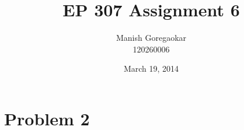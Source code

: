 \documentclass[12pt]{article}
\title{EP 307 Assignment 6}
\author{Manish Goregaokar\\120260006}
\date{March 19, 2014}
\begin{document}
\maketitle
\section*{Problem 2}
\end{document}
